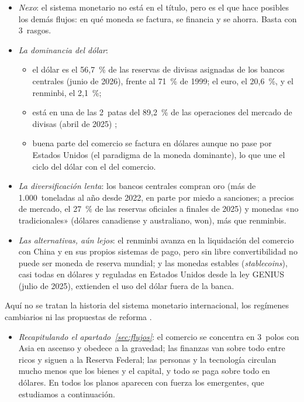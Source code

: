 \documentclass[11pt]{article}
\begin{document}
\begin{itemize}
\item \emph{Nexo}: el sistema monetario no está en el título, pero es el que hace posibles los demás flujos: en qué moneda se factura, se financia y se ahorra. Basta con 3~rasgos.
\item \emph{La dominancia del dólar}:
  \begin{itemize}
  \item el dólar es el 56,7~\% de las reservas de divisas asignadas de los bancos centrales (junio de 2026), frente al 71~\% de 1999; el euro, el 20,6~\%, y el renminbi, el 2,1~\%\nocite{FMI2026COFER};
  \item está en una de las 2~patas del 89,2~\% de las operaciones del mercado de divisas (abril de 2025)\nocite{BIS2025Trienal} ;
  \item buena parte del comercio se factura en dólares aunque no pase por Estados Unidos (el paradigma de la moneda dominante), lo que une el ciclo del dólar con el del comercio\nocite{Gopinath2020DCP}.
  \end{itemize}
\item \emph{La diversificación lenta}: los bancos centrales compran oro (más de 1.000~toneladas al año desde 2022, en parte por miedo a sanciones; a precios de mercado, el 27~\% de las reservas oficiales a finales de 2025) y monedas «no tradicionales» (dólares canadiense y australiano, won), más que renminbis\nocite{BCE2026PapelEuro}.
\item \emph{Las alternativas, aún lejos}: el renminbi avanza en la liquidación del comercio con China y en sus propios sistemas de pago, pero sin libre convertibilidad no puede ser moneda de reserva mundial; y las monedas estables (\emph{stablecoins}), casi todas en dólares y reguladas en Estados Unidos desde la ley GENIUS (julio de 2025), extienden el uso del dólar fuera de la banca\nocite{Congreso2025GENIUS}.
\end{itemize}

\begin{anotaciones}
Aquí no se tratan la historia del sistema monetario internacional, los regímenes cambiarios ni las propuestas de reforma  .
\end{anotaciones}

\begin{itemize}
\item \emph{Recapitulando el apartado~\ref{sec:flujos}}: el comercio se concentra en 3~polos con Asia en ascenso y obedece a la gravedad; las finanzas van sobre todo entre ricos y siguen a la Reserva Federal; las personas y la tecnología circulan mucho menos que los bienes y el capital, y todo se paga sobre todo en dólares. En todos los planos aparecen con fuerza los emergentes, que estudiamos a continuación.
\end{itemize}
\end{document}
